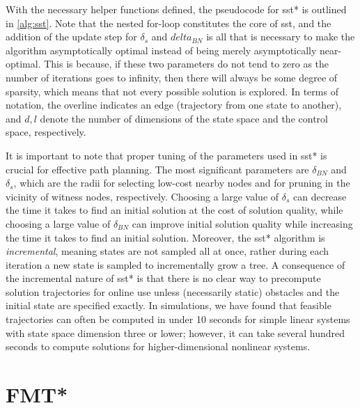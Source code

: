 With the necessary helper functions defined, the pseudocode for \gls{sst}* is outlined in \autoref{alg:sst}. Note that the nested for-loop constitutes the core of \gls{sst}, and the addition of the update step for $\delta_s$ and $delta_{BN}$ is all that is necessary to make the algorithm asymptotically optimal instead of being merely asymptotically near-optimal. This is because, if these two parameters do not tend to zero as the number of iterations goes to infinity, then there will always be some degree of sparsity, which means that not every possible solution is explored. In terms of notation, the overline indicates an edge (trajectory from one state to another), and $d, l$ denote the number of dimensions of the state space and the control space, respectively.


It is important to note that proper tuning of the parameters used in \gls{sst}* is crucial for effective path planning. The most significant parameters are $\delta_{BN}$ and $\delta_s$, which are the radii for selecting low-cost nearby nodes and for pruning in the vicinity of witness nodes, respectively. Choosing a large value of $\delta_s$ can decrease the time it takes to find an initial solution at the cost of solution quality, while choosing a large value of $\delta_{BN}$ can improve initial solution quality while increasing the time it takes to find an initial solution. Moreover, the \gls{sst}* algorithm is \emph{incremental}, meaning states are not sampled all at once, rather during each iteration a new state is sampled to incrementally grow a tree. A consequence of the incremental nature of \gls{sst}* is that there is no clear way to precompute solution trajectories for online use unless (necessarily static) obstacles and the initial state are specified exactly. In simulations, we have found that feasible trajectories can often be computed in under 10 seconds for simple linear systems with state space dimension three or lower; however, it can take several hundred seconds to compute solutions for higher-dimensional nonlinear systems.




\section{FMT*}


